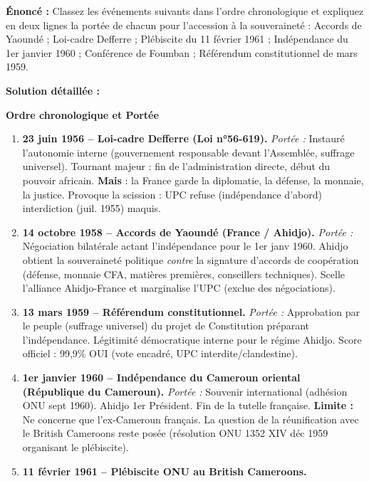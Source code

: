 \documentclass[11pt]{article}
\newcommand{\cle}[1]{{\popxbold\color{popdark}#1}}
\begin{document}
\begin{exoresolu}
\textbf{Énoncé :} \guillemotleft Classez les événements suivants dans l'ordre chronologique et expliquez en deux lignes la portée de chacun pour l'accession à la souveraineté : Accords de Yaoundé ; Loi-cadre Defferre ; Plébiscite du 11 février 1961 ; Indépendance du 1er janvier 1960 ; Conférence de Foumban ; Référendum constitutionnel de mars 1959. \guillemotright

\tcblower
\textbf{Solution détaillée :}

\textbf{Ordre chronologique et Portée}

\begin{enumerate}
    \item \textbf{23 juin 1956 -- Loi-cadre Defferre (Loi n°56-619).}
    \emph{Portée :} Instauré l'\cle{autonomie interne} (gouvernement responsable devant l'Assemblée, suffrage universel). Tournant majeur : fin de l'administration directe, début du pouvoir africain. \textbf{Mais} : la France garde la diplomatie, la défense, la monnaie, la justice. Provoque la scission : UPC refuse (indépendance d'abord) \rightarrow interdiction (juil. 1955) \rightarrow maquis.
    \item \textbf{14 octobre 1958 -- Accords de Yaoundé (France / Ahidjo).}
    \emph{Portée :} \cle{Négociation bilatérale} actant l'indépendance pour le 1er janv 1960. Ahidjo obtient la souveraineté politique \emph{contre} la signature d'accords de coopération (défense, monnaie CFA, matières premières, conseillers techniques). Scelle l'alliance Ahidjo-France et marginalise l'UPC (exclue des négociations).
    \item \textbf{13 mars 1959 -- Référendum constitutionnel.}
    \emph{Portée :} Approbation par le peuple (suffrage universel) du projet de Constitution préparant l'indépendance. Légitimité démocratique interne pour le régime Ahidjo. Score officiel : 99,9\% OUI (vote encadré, UPC interdite/clandestine).
    \item \textbf{1er janvier 1960 -- Indépendance du Cameroun oriental (République du Cameroun).}
    \emph{Portée :} \cle{Souvenir international} (adhésion ONU sept 1960). Ahidjo 1er Président. Fin de la tutelle française. \textbf{Limite :} Ne concerne que l'ex-Cameroun français. La question de la réunification avec le British Cameroons reste posée (résolution ONU 1352 XIV déc 1959 organisant le plébiscite).
    \item \textbf{11 février 1961 -- Plébiscite ONU au British Cameroons.}

\end{enumerate}
\end{exoresolu}
\end{document}
